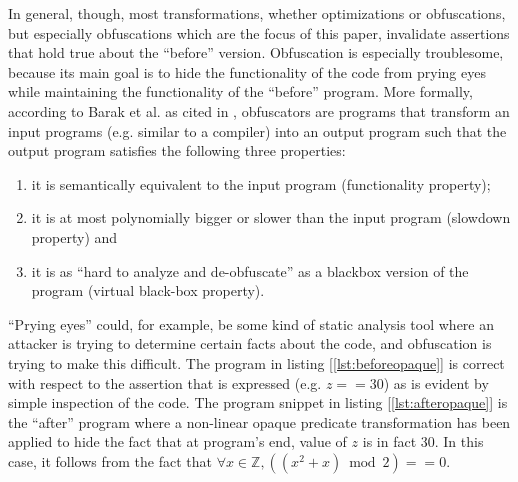 \documentclass[compsoc,conference,a4paper,10pt,times]{IEEEtran}
\begin{document}
In general, though, most transformations, whether optimizations or obfuscations, but especially obfuscations which are the focus of this paper, invalidate assertions that hold true about the ``before'' version. Obfuscation is especially troublesome, because its main goal is to hide the functionality of the code from prying eyes while maintaining the functionality of the ``before'' program. More formally, according to Barak et al. as cited in \cite{BanescuCGNP16}, obfuscators are programs that transform an input programs (e.g. similar to a compiler) into an output program such that the output program satisfies the following three properties:
\begin{enumerate}
   \item it is semantically equivalent to the input program (functionality property); \label{itm:firstproperty}
   \item it is at most polynomially bigger or slower than the input program (slowdown property) and \label{itm:secondproperty}
   \item it is as ``hard to analyze and de-obfuscate'' as a blackbox version of the program (virtual black-box property). \label{itm:thirdproperty}
\end{enumerate}
``Prying eyes'' could, for example, be some kind of static analysis tool where an attacker is trying to determine certain facts about the code, and obfuscation is trying to make this difficult. The program in listing [\ref{lst:beforeopaque}] is correct with respect to the assertion that is expressed (e.g. $z == 30$) as is evident by simple inspection of the code. The program snippet in listing [\ref{lst:afteropaque}] is the ``after'' program where a non-linear opaque predicate transformation has been applied to hide the fact that at program's end, value of $z$ is in fact 30. In this case, it follows from the fact that $\forall x \in \mathbb{Z}, ((x^2 + x)\bmod 2) == 0$. 
\end{document}
